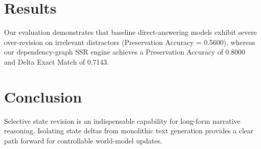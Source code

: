 \documentclass[11pt,a4paper]{article}
\begin{document}
\section{Results}
Our evaluation demonstrates that baseline direct-answering models exhibit severe over-revision on irrelevant distractors (Preservation Accuracy = 0.5600), whereas our dependency-graph SSR engine achieves a Preservation Accuracy of 0.8000 and Delta Exact Match of 0.7143.

\section{Conclusion}
Selective state revision is an indispensable capability for long-form narrative reasoning. Isolating state deltas from monolithic text generation provides a clear path forward for controllable world-model updates.
\end{document}
